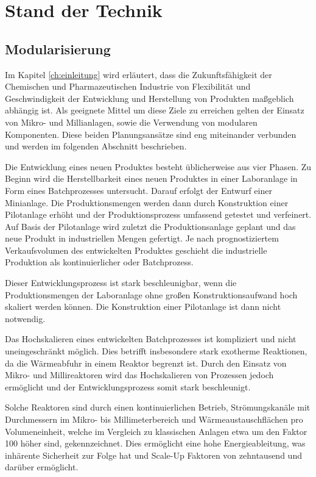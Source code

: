 \chapter{Stand der Technik} \label{ch:sdt}
\section{Modularisierung}\label{sec:sdt_modularisierung}
Im Kapitel \ref{ch:einleitung} wird erl\"autert, dass die Zukunftsf\"ahigkeit der Chemischen und Pharmazeutischen Industrie von Flexibilit\"at und Geschwindigkeit der Entwicklung und Herstellung von Produkten ma\ss{}geblich abh\"angig ist. Als geeignete Mittel um diese Ziele zu erreichen gelten der Einsatz von Mikro- und Millianlagen, sowie die Verwendung von modularen Komponenten. Diese beiden Planungsans\"atze sind eng miteinander verbunden und werden im folgenden Abschnitt beschrieben.  


Die Entwicklung eines neuen Produktes besteht \"ublicherweise aus vier Phasen. Zu Beginn wird die Herstellbarkeit eines neuen Produktes in einer Laboranlage in Form eines Batchprozesses untersucht. Darauf erfolgt der Entwurf einer Minianlage. Die Produktionsmengen werden dann durch Konstruktion einer Pilotanlage erh\"oht und der Produktionsprozess umfassend getestet und verfeinert. Auf Basis der Pilotanlage wird zuletzt die Produktionsanlage geplant und das neue Produkt in industriellen Mengen gefertigt. Je nach prognostiziertem Verkaufsvolumen des entwickelten Produktes geschieht die industrielle Produktion als kontinuierlicher oder Batchprozess. \cite{Grundemann_2012}

Dieser  Entwicklungsprozess ist stark beschleunigbar, wenn die Produktionsmengen der Laboranlage ohne gro\ss{}en Konstruktionsaufwand hoch skaliert werden k\"onnen. Die Konstruktion einer Pilotanlage ist dann nicht notwendig.

Das Hochskalieren eines entwickelten Batchprozesses ist kompliziert und nicht uneingeschr\"ankt m\"oglich. Dies betrifft insbesondere stark exotherme Reaktionen, da die W\"armeabfuhr in einem Reaktor begrenzt ist. \cite{Brodhagen_2012} \newline
Durch den Einsatz von Mikro- und Millireaktoren wird das Hochskalieren von Prozessen jedoch erm\"oglicht und der Entwicklungsprozess somit stark beschleunigt. \cite{Grundemann_2012, Brodhagen_2012, Helling_2012, Kockmann_2012, Hessel_2012}

Solche Reaktoren sind durch einen kontinuierlichen Betrieb, Str\"omungskan\"ale mit Durchmessern im Mikro- bis Millimeterbereich und W\"armeaustauschfl\"achen pro Volumeneinheit, welche im Vergleich zu klassischen Anlagen etwa um den Faktor 100 h\"oher sind, gekennzeichnet. Dies erm\"oglicht eine hohe Energieableitung, was inh\"arente Sicherheit zur Folge hat und Scale-Up Faktoren von zehntausend und dar\"uber erm\"oglicht. \cite{Brodhagen_2012, Kockmann_2012a,Behr_2012}


